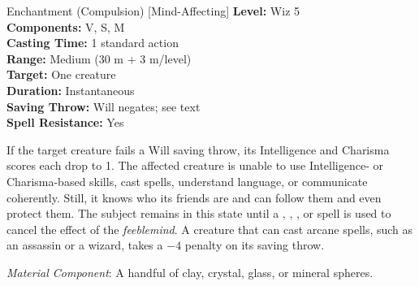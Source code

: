 {Enchantment (Compulsion) [Mind-Affecting]}
{
	\textbf{Level:}
	Wiz 5\\
	\textbf{Components:}
	V, S, M\\
	\textbf{Casting Time:}
	1 standard action\\
	\textbf{Range:}
	Medium (30 m + 3 m/level)\\
	\textbf{Target:}
	One creature\\
	\textbf{Duration:}
	Instantaneous\\
	\textbf{Saving Throw:}
	Will negates; see text\\
	\textbf{Spell Resistance:}
	Yes\\
}
{
	If the target creature fails a Will saving throw, its Intelligence and Charisma scores each drop to 1. The affected creature is unable to use Intelligence- or Charisma-based skills, cast spells, understand language, or communicate coherently. Still, it knows who its friends are and can follow them and even protect them. The subject remains in this state until a , , , or  spell is used to cancel the effect of the \emph{feeblemind}. A creature that can cast arcane spells, such as an assassin or a wizard, takes a $-4$ penalty on its saving throw.

	\textit{Material Component}:
	A handful of clay, crystal, glass, or mineral spheres.

}
